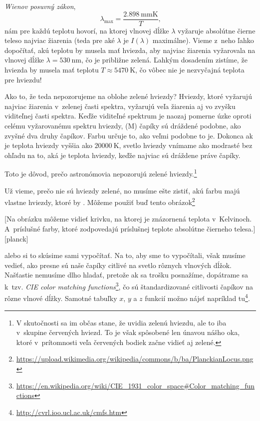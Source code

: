 \emph{Wienov posuvný zákon},
$$
  \lambda_{\text{max}} = \frac{\SI{2.898}{\milli\metre\kelvin}}{T}\text{,}
$$
nám pre každú teplotu hovorí, na ktorej vlnovej dĺžke $\lambda$ vyžaruje absolútne čierne teleso najviac žiarenia (teda pre aké $\lambda$ je $I(\lambda)$ maximálne).
Vieme z~neho ľahko dopočítať, akú teplotu by musela mať hviezda, aby najviac žiarenia vyžarovala na vlnovej dĺžke $\lambda = \SI{530}{\nano\metre}$, čo je približne zelená.
Ľahkým dosadením zistíme, že hviezda by musela mať teplotu $T \approx \SI{5470}{\kelvin}$, čo vôbec nie je nezvyčajná teplota pre hviezdu! 

Ako to, že teda nepozorujeme na oblohe zelené hviezdy? Hviezdy, ktoré vyžarujú najviac žiarenia v~zelenej časti spektra, vyžarujú veľa žiarenia aj vo zvyšku viditeľnej časti spektra.
Keďže viditeľné spektrum je naozaj pomerne úzke oproti celému vyžarovanému spektru hviezdy,  (M) čapíky sú dráždené podobne, ako zvyšné dva druhy čapíkov.
Farbu určuje to, ako veľmi podobne to je. Dokonca ak je teplota hviezdy vyššia ako $\SI{20000}{\kelvin}$, svetlo hviezdy vnímame ako modrasté bez ohľadu na to, aká je teplota hviezdy,
keďže najviac sú dráždene práve  čapíky.

Toto je dôvod, prečo astronómovia nepozorujú zelené hviezdy.\footnote{V skutočnosti sa im občas stane,
že uvidia zelenú hviezdu, ale to iba v~skupine červených hviezd. To je však spôsobené len únavou nášho oka, ktoré v~prítomnosti veľa červených bodiek začne vidieť aj zelené.}

Už vieme, prečo nie sú hviezdy zelené, no musíme ešte zistiť, akú farbu majú vlastne hviezdy, ktoré by .
Môžeme použiť buď tento obrázok\footnote{\url{https://upload.wikimedia.org/wikipedia/commons/b/ba/PlanckianLocus.png}}

[Na obrázku môžeme vidieť krivku, na ktorej je znázornená teplota v~Kelvinoch. A~príslušné farby, ktoré zodpovedajú príslušnej teplote absolútne čierneho telesa.][planck]

alebo si to skúsime sami vypočítať. Na to, aby sme to vypočítali, však musíme vedieť, ako presne sú naše čapíky citlivé na svetlo rôznych vlnových dĺžok.
Našťastie nemusíme dlho hladať, pretože ak sa trošku posnažíme, dopátrame sa k~tzv.
\emph{CIE color matching functions}\footnote{\url{https://en.wikipedia.org/wiki/CIE_1931_color_space\#Color_matching_functions}},
čo sú štandardizované citlivosti čapíkov na rôzne vlnové dĺžky. Samotné tabuľky $x$, $y$ a $z$ funkcií možno nájsť napríklad tu\footnote{\url{http://cvrl.ioo.ucl.ac.uk/cmfs.htm}}.

